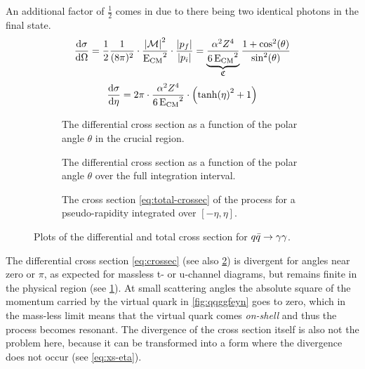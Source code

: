 An additional factor of \(\frac{1}{2}\) comes in due to there being
two identical photons in the final state.
\begin{equation}
  \label{eq:crossec}
  \dv{\sigma}{\Omega} =
  \frac{1}{2}\frac{1}{(8\pi)^2}\cdot\frac{\abs{\mathcal{M}}^2}{\operatorname{E_{\text{CM}}}^2}\cdot\frac{\abs{p_f}}{\abs{p_i}}
  = \underbrace{\frac{\alpha^2Z^4}{6\operatorname{E_{\text{CM}}}^2}}_{\mathfrak{C}}\frac{1+\cos^2(\theta)}{\sin^2(\theta)}
\end{equation}
%
\begin{equation}
  \label{eq:xs-eta}
  \dv{\sigma}{\eta} = 2\pi\cdot\frac{\alpha^2Z^4}{6\operatorname{E_{\text{CM}}}^2}\cdot\qty(\tanh(\eta)^2 + 1)
\end{equation}
%
\begin{figure}[ht]
  \centering
  \begin{subfigure}[t]{.49\textwidth}
    \centering {}

    \caption[Plot of the differential cross section of the \(\qqgg\)
    process.]{\label{fig:diffxs_zoom} The differential cross section as a
      function of the polar angle \(\theta\) in the crucial region.}
  \end{subfigure}
  \begin{subfigure}[t]{.49\textwidth}
    \centering {}
    \caption[Plot of the differential cross section of the \(\qqgg\)
    process.]{\label{fig:diffxs} The differential cross section as a
      function of the polar angle \(\theta\) over the full integration
      interval. }
  \end{subfigure}
  \begin{subfigure}[t]{.49\textwidth}
  \centering
  \caption[Plot of the total cross section of the \(\qqgg\)
  process.]{\label{fig:totxs} The cross section
    \cref{eq:total-crossec} of the process for a pseudo-rapidity
    integrated over \([-\eta, \eta]\).}
\end{subfigure}
\caption{\label{fig:xsfirst} Plots of the differential and total cross section
  for \(\qqgg\).}
\end{figure}
%
The differential cross section \cref{eq:crossec} (see also
\cref{fig:diffxs}) is divergent for angles near zero or \(\pi\), as
expected for massless t- or u-channel diagrams, but remains finite in
the physical region (see \cref{fig:diffxs_zoom}). At small scattering
angles the absolute square of the momentum carried by the virtual
quark in \cref{fig:qqggfeyn} goes to zero, which in the mass-less
limit means that the virtual quark comes \emph{on-shell} and thus the
process becomes resonant. The divergence of the cross section itself
is also not the problem here, because it can be transformed into a
form where the divergence does not occur (see \cref{eq:xs-eta}).

